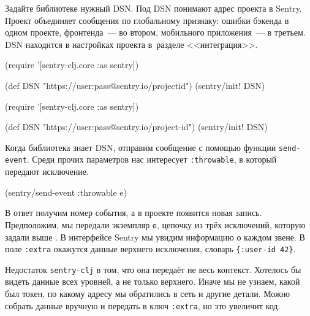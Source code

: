 
Задайте библиотеке нужный DSN. Под DSN понимают адрес проекта в Sentry. Проект
объединяет сообщения по глобальному признаку: ошибки бэкенда в одном проекте,
фронтенда~--- во втором, мобильного приложения~--- в третьем. DSN находится в
настройках проекта в~разделе <<интеграция>>.

\ifx\devicetype\mobile

\begin{english}
  \begin{clojure}
(require '[sentry-clj.core :as sentry])

(def DSN
 "https://user:pass@sentry.io/projectid")
(sentry/init! DSN)
  \end{clojure}
\end{english}

\else

\begin{english}
  \begin{clojure}
(require '[sentry-clj.core :as sentry])

(def DSN "https://user:pass@sentry.io/project-id")
(sentry/init! DSN)
  \end{clojure}
\end{english}

\fi

Когда библиотека знает DSN, отправим сообщение с помощью функции
\verb|send-event|. Среди прочих параметров нас интересует \verb|:throwable|, в
который передают исключение.

\begin{english}
  \begin{clojure}
(sentry/send-event {:throwable e})
  \end{clojure}
\end{english}

В ответ получим номер события, а в проекте появится новая запись. Предположим,
мы передали экземпляр \verb|e|, цепочку из трёх исключений, которую задали
выше . В интерфейсе Sentry мы увидим информацию о каждом звене. В
поле \verb|:extra| окажутся данные верхнего исключения, словарь
\verb|{:user-id 42}|.

Недостаток \verb|sentry-clj| в том, что она передаёт не весь
контекст. Хотелось бы видеть данные всех уровней, а не только верхнего. Иначе мы
не узнаем, какой был токен, по какому адресу мы обратились в сеть и другие
детали. Можно собрать данные вручную и передать в ключ \verb|:extra|, но это
увеличит код.



